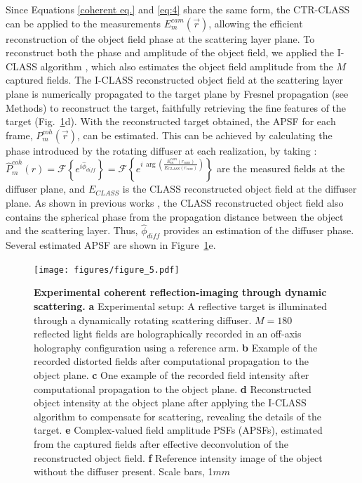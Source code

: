 \documentclass[pdflatex,sn-mathphys-num]{sn-jnl}%
\theoremstyle{thmstyleone}%
\theoremstyle{thmstyletwo}%
\theoremstyle{thmstylethree}%
\begin{document}
Since Equations \ref{coherent eq.} and \ref{eq:4} share the same form, the CTR-CLASS \cite{lee22} can be applied to the measurements $E^{cam}_m(\vec{r})$, allowing the efficient reconstruction of the object field phase at the scattering layer plane. To reconstruct both the phase and amplitude of the object field, we applied the I-CLASS algorithm \cite{weinberg2023noninvasive}, which also estimates the object field amplitude from the $M$ captured fields. 
The I-CLASS reconstructed object field at the scattering layer plane is numerically propagated to the target plane by Fresnel propagation (see Methods) to reconstruct the target, faithfully retrieving the fine features of the target (Fig.~\ref{fig5}d). 
With the reconstructed target obtained, the APSF for each frame, $P^{coh}_m(\vec{r})$, can be estimated. This can be achieved by calculating the phase introduced by the rotating diffuser at each realization, by taking \cite{sunray2024beyond}:
$\hat{P}^{coh}_{m}(r) = \mathcal{F} \left\{ e^{i \hat{\phi}_{diff}} \right\} = \mathcal{F} \left\{ e^{i \, \arg \left( \frac{E_m^{cam}(r_{cam})}{E_{CLASS}(r_{cam})} \right)} \right\}$
are the measured fields at the diffuser plane, and $E_{CLASS}$ is the CLASS reconstructed object field at the diffuser plane. As shown in previous works \cite{choi2022flexible,sunray2024beyond}, the CLASS reconstructed object field also contains the spherical phase from the propagation distance between the object and the scattering layer. Thus, $\hat{\phi}_{diff}$ provides an estimation of the diffuser phase. 
Several estimated APSF are shown in Figure~\ref{fig5}e. 

\begin{figure}[htb!]
	\centering
	\texttt{[image: figures/figure\_5.pdf]}
    \caption{\textbf{Experimental coherent reflection-imaging through dynamic scattering.} 
    \textbf{a} Experimental setup: A reflective target is illuminated through a dynamically rotating scattering diffuser. $M=180$ reflected light fields are holographically recorded in an off-axis holography configuration using a reference arm. %
    \textbf{b} Example of the recorded distorted fields after computational propagation to the object plane. \textbf{c} One example of the recorded field intensity after computational propagation to the object plane. 
    \textbf{d} Reconstructed object intensity at the object plane after applying the I-CLASS algorithm to compensate for scattering, revealing the details of the target. 
\textbf{e} Complex-valued field amplitude PSFs (APSFs), estimated from the captured fields after effective deconvolution of the reconstructed object field. 
\textbf{f} Reference intensity image of the object without the diffuser present. Scale bars, 1$mm$}
    \label{fig5}
\end{figure}
\end{document}
